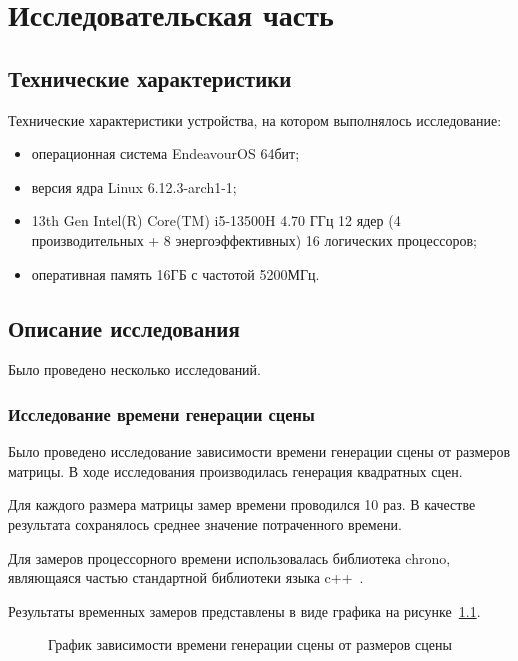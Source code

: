 \chapter{Исследовательская часть}

\section{Технические характеристики}

Технические характеристики устройства, на котором выполнялось исследование:
\begin{itemize}
  \item операционная система EndeavourOS 64бит;
  \item версия ядра Linux 6.12.3-arch1-1;
  \item 13th Gen Intel(R) Core(TM) i5-13500H 4.70 ГГц 12 ядер (4
  производительных + 8 энергоэффективных) 16 логических процессоров;
  \item оперативная память 16ГБ с частотой 5200МГц.
\end{itemize}

\section{Описание исследования}

Было проведено несколько исследований.

\subsection*{Исследование времени генерации сцены}

Было проведено исследование зависимости времени генерации сцены от размеров матрицы. В ходе исследования производилась генерация квадратных сцен.

Для каждого размера матрицы замер времени проводился 10 раз. В качестве результата сохранялось среднее значение потраченного времени.

Для замеров процессорного времени использовалась библиотека chrono, являющаяся частью стандартной библиотеки языка c++~\cite{cpp}.

Результаты временных замеров представлены в виде графика на рисунке~\ref{fig:qwfc_graph}.

\begin{figure}[h!]
  \centering
  
  \caption{График зависимости времени генерации сцены от размеров сцены}
  \label{fig:qwfc_graph}
\end{figure}

